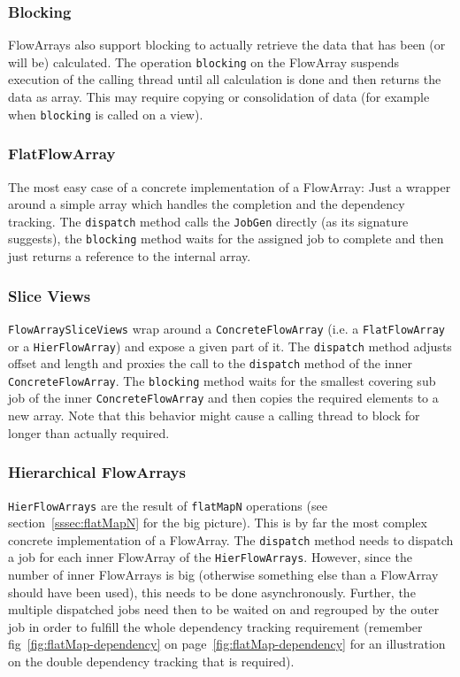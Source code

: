 \documentclass[runningheads,a4paper,fleqn]{llncs}
\begin{document}
\subsubsection{Blocking}
FlowArrays also support blocking to actually retrieve the data that
has been (or will be) calculated. The operation \texttt{blocking} on
the FlowArray suspends execution of the calling thread until all
calculation is done and then returns the data as array. This may
require copying or consolidation of data (for example when
\texttt{blocking} is called on a view).

\subsubsection{FlatFlowArray}
The most easy case of a concrete implementation of a FlowArray: Just a
wrapper around a simple array which handles the completion and the
dependency tracking. The \texttt{dispatch} method calls the
\texttt{JobGen} directly (as its signature suggests), the
\texttt{blocking} method waits for the assigned job to complete and
then just returns a reference to the internal array.

\subsubsection{Slice Views}
\texttt{FlowArraySliceViews} wrap around a \texttt{ConcreteFlowArray}
(i.e. a \texttt{FlatFlowArray} or a \texttt{HierFlowArray})
and expose a given part of it. The \texttt{dispatch} method adjusts 
offset and length and proxies the call to the \texttt{dispatch} method
of the inner
\texttt{ConcreteFlowArray}. The \texttt{blocking} method waits for the
smallest covering sub job of the inner \texttt{ConcreteFlowArray} and
then copies the required elements to a new array. Note that this
behavior might cause a calling thread to block for longer than
actually required.

\subsubsection{Hierarchical FlowArrays}
\texttt{HierFlowArrays} are the result of \texttt{flatMapN} operations
(see section~\ref{sssec:flatMapN} for the big picture). This is by far
the most complex concrete implementation of a FlowArray. The
\texttt{dispatch} method needs to dispatch a job for each inner
FlowArray of the \texttt{HierFlowArrays}. However, since the number of
inner FlowArrays is big (otherwise something else than a FlowArray
should have been used), 
this needs to be done asynchronously. Further, the multiple dispatched
jobs need then to be waited on and regrouped by the outer job in order
to fulfill the whole dependency tracking requirement (remember
fig~\ref{fig:flatMap-dependency} on
page~\ref{fig:flatMap-dependency} for an illustration on the
double dependency tracking that is required).
\end{document}
